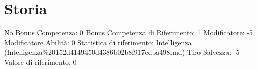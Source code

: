 \section{Storia}\label{storia}

\begin{description}
\tightlist
\item[Tags: ABI]
No Bonus Competenza: 0 Bonus Competenza di Riferimento: 1 Modificatore:
-5 Modificatore Abilità: 0 Statistica di riferimento: Intelligenza
(Intelligenza\%20152d4149450d4386b02b8f917edba498.md) Tiro Salvezza: -5
Valore di riferimento: 0
\end{description}
